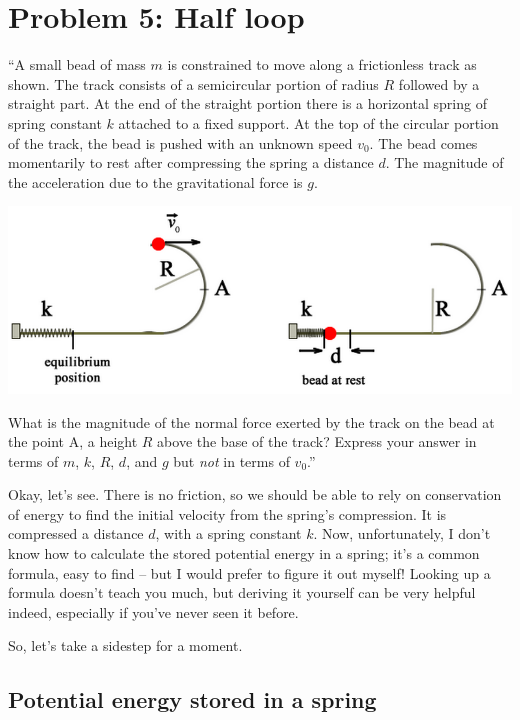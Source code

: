 \documentclass[12pt,a4paper]{report}
\begin{document}
\section{Problem 5: Half loop}

``A small bead of mass $m$ is constrained to move along a frictionless track as shown. The track consists of a semicircular portion of radius $R$ followed by a straight part. At the end of the straight portion there is a horizontal spring of spring constant $k$ attached to a fixed support. At the top of the circular portion of the track, the bead is pushed with an unknown speed $v_0$. The bead comes momentarily to rest after compressing the spring a distance $d$. The magnitude of the acceleration due to the gravitational force is $g$.

\begin{center}
\includegraphics[scale=0.6]{Graphics/h4p5}
\end{center}

What is the magnitude of the normal force exerted by the track on the bead at the point A, a height $R$ above the base of the track? Express your answer in terms of $m$, $k$, $R$, $d$, and $g$ but \emph{not} in terms of $v_0$.''

Okay, let's see. There is no friction, so we should be able to rely on conservation of energy to find the initial velocity from the spring's compression. It is compressed a distance $d$, with a spring constant $k$. Now, unfortunately, I don't know how to calculate the stored potential energy in a spring; it's a common formula, easy to find -- but I would prefer to figure it out myself! Looking up a formula doesn't teach you much, but deriving it yourself can be very helpful indeed, especially if you've never seen it before.

So, let's take a sidestep for a moment.

\subsection{Potential energy stored in a spring}
\end{document}
